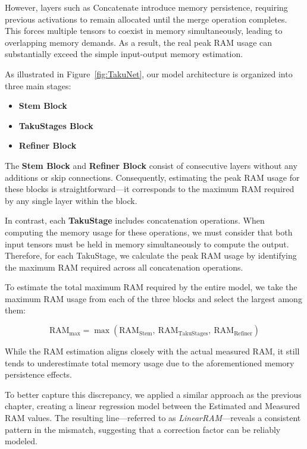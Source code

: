 However, layers such as Concatenate introduce memory persistence, requiring previous activations to remain allocated until the merge operation completes. This forces multiple tensors to coexist in memory simultaneously, leading to overlapping memory demands. As a result, the real peak RAM usage can substantially exceed the simple input-output memory estimation. 


As illustrated in Figure~\ref{fig:TakuNet}, our model architecture is organized into three main stages:

\begin{itemize}
    \item \textbf{Stem Block}
    \item \textbf{TakuStages Block}
    \item \textbf{Refiner Block}
\end{itemize}

The \textbf{Stem Block} and \textbf{Refiner Block} consist of consecutive layers without any additions or skip connections. Consequently, estimating the peak RAM usage for these blocks is straightforward—it corresponds to the maximum RAM required by any single layer within the block.

In contrast, each \textbf{TakuStage} includes concatenation operations. When computing the memory usage for these operations, we must consider that both input tensors must be held in memory simultaneously to compute the output. Therefore, for each TakuStage, we calculate the peak RAM usage by identifying the maximum RAM required across all concatenation operations.

To estimate the total maximum RAM required by the entire model, we take the maximum RAM usage from each of the three blocks and select the largest among them:

\begin{equation}
\text{RAM}_{\text{max}} = \max\left( \text{RAM}_{\text{Stem}},\ \text{RAM}_{\text{TakuStages}},\ \text{RAM}_{\text{Refiner}} \right)
\label{eq:max_ram}
\end{equation}

While the RAM estimation aligns closely with the actual measured RAM, it still tends to underestimate total memory usage due to the aforementioned memory persistence effects.

To better capture this discrepancy, we applied a similar approach as the previous chapter, creating a linear regression model between the Estimated and Measured RAM values. The resulting line—referred to as \textit{LinearRAM}—reveals a consistent pattern in the mismatch, suggesting that a correction factor can be reliably modeled.

